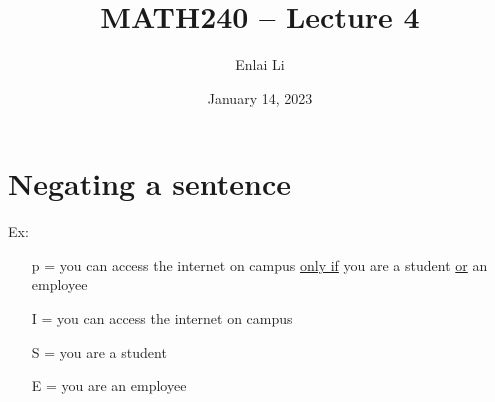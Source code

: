 \documentclass{article}
\author{Enlai Li}
\title{MATH240 -- Lecture 4}
\date{January 14, 2023}
\begin{document}
\maketitle
\section{Negating a sentence}
Ex:
\begin{itemize}
    \item [p =] you can access the internet on campus \underline{only if} you are a student \underline{or} an employee
    \item [I =] you can access the internet on campus
    \item [S =] you are a student
    \item [E =] you are an employee
\end{itemize}
\end{document}
